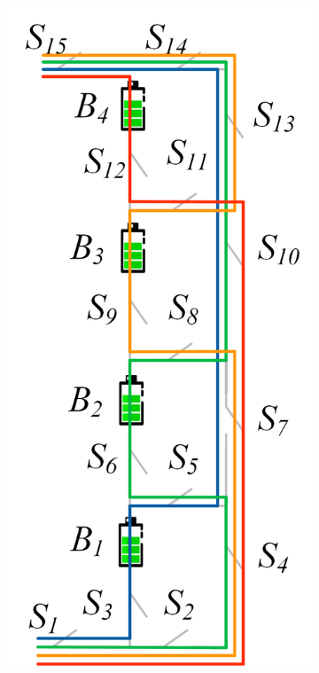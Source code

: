 \documentclass{article}
\begin{document}
\begin{figure}[htbp]
    \centering
    \begin{subfigure}[b]{0.2\textwidth}
        \includegraphics[width=\textwidth]{e4-sp.png}

\end{subfigure}
\end{figure}
\end{document}
